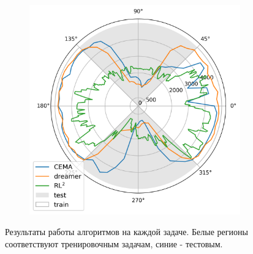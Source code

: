 \begin{frame}
\begin{columns}[t]
\begin{column}{0.48\linewidth}
\begin{figure}
\begin{subfigure}{\linewidth}
          \includegraphics[height=0.5\paperheight]{images/performance/rotated_drawer_eval.png}
          \label{rd_gen_plot}
        \end{subfigure}
      \caption{Результаты работы алгоритмов на каждой задаче. Белые регионы соответствуют тренировочным задачам, синие - тестовым.}
    \end{figure}
\end{column}
\end{columns}
\end{frame}